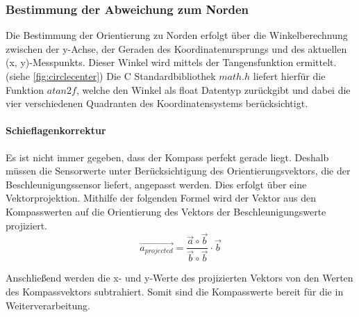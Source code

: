 \subsubsection{Bestimmung der Abweichung zum Norden}
Die Bestimmung der Orientierung zu Norden erfolgt über die Winkelberechnung zwischen der 
y-Achse, der Geraden des Koordinatenursprungs und des aktuellen (x, y)-Messpunkts. 
Dieser Winkel wird mittels der Tangensfunktion ermittelt. (siehe \autoref{fig:circlecenter})
Die C Standardbibliothek $math.h$ liefert hierfür die Funktion $atan2f$, 
welche den Winkel als float Datentyp zurückgibt und dabei die vier verschiedenen Quadranten des Koordinatensystems berücksichtigt.

\paragraph{Schieflagenkorrektur}
Es ist nicht immer gegeben, dass der Kompass perfekt gerade liegt. 
Deshalb müssen die Sensorwerte unter Berücksichtigung des Orientierungsvektors, die der Beschleunigungssensor liefert, angepasst werden. 
Dies erfolgt über eine Vektorprojektion.
Mithilfe der folgenden Formel wird der Vektor aus den Kompasswerten auf die Orientierung des Vektors der Beschleunigungswerte projiziert.
\[\vec{a_{projected}} = \frac{\vec{a} \circ \vec{b}}{\vec{b} \circ \vec{b}} \cdot \vec{b} \]
 
Anschließend werden die x- und y-Werte des projizierten Vektors von den Werten des Kompassvektors subtrahiert. 
Somit sind die Kompasswerte bereit für die in Weiterverarbeitung. \autocite{compasstilt}